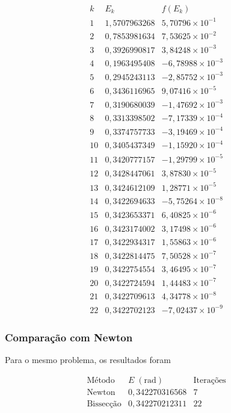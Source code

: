 \documentclass[
	12pt,				%
	openright,			%
	a4paper,			%
	english,			%
	french,				%
	spanish,			%
	brazil,				%
	]{abntex2}
\begin{document}
\[
\begin{array}{c|c|c}
k & E_k & f(E_k) \\ \hline
1  & 1,5707963268 & 5,70796\times10^{-1} \\
2  & 0,7853981634 & 7,53625\times10^{-2} \\
3  & 0,3926990817 & 3,84248\times10^{-3} \\
4  & 0,1963495408 & -6,78988\times10^{-3} \\
5  & 0,2945243113 & -2,85752\times10^{-3} \\
6  & 0,3436116965 & 9,07416\times10^{-5} \\
7  & 0,3190680039 & -1,47692\times10^{-3} \\
8  & 0,3313398502 & -7,17339\times10^{-4} \\
9  & 0,3374757733 & -3,19469\times10^{-4} \\
10 & 0,3405437349 & -1,15920\times10^{-4} \\
11 & 0,3420777157 & -1,29799\times10^{-5} \\
12 & 0,3428447061 & 3,87830\times10^{-5} \\
13 & 0,3424612109 & 1,28771\times10^{-5} \\
14 & 0,3422694633 & -5,75264\times10^{-8} \\
15 & 0,3423653371 & 6,40825\times10^{-6} \\
16 & 0,3423174002 & 3,17498\times10^{-6} \\
17 & 0,3422934317 & 1,55863\times10^{-6} \\
18 & 0,3422814475 & 7,50528\times10^{-7} \\
19 & 0,3422754554 & 3,46495\times10^{-7} \\
20 & 0,3422724594 & 1,44483\times10^{-7} \\
21 & 0,3422709613 & 4,34778\times10^{-8} \\
22 & 0,3422702123 & -7,02437\times10^{-9}
\end{array}
\]

\subsubsection*{Comparação com Newton}

Para o mesmo problema, os resultados foram

\[
\begin{array}{c|c|c}
\text{Método} & E\;(\text{rad}) & \text{Iterações} \\ \hline
\text{Newton}
& 0,342270316568
& 7
\\
\text{Bissecção}
& 0,342270212311
& 22
\end{array}
\]
\end{document}
